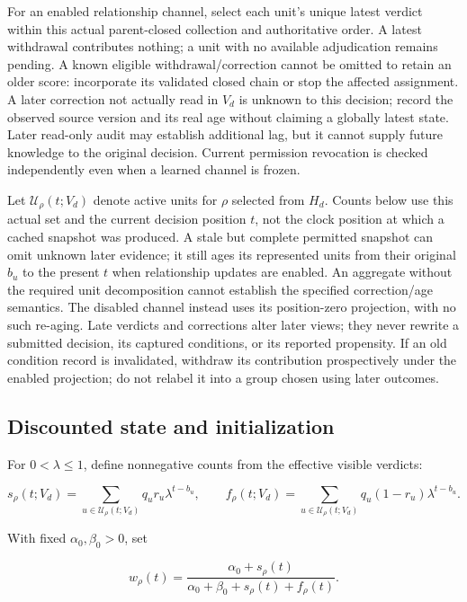 \documentclass[
  english,
  11pt,
]{article}
\begin{document}
For an enabled relationship channel, select each unit's unique latest
verdict within this actual parent-closed collection and authoritative
order. A latest withdrawal contributes nothing; a unit with no available
adjudication remains pending. A known eligible withdrawal/correction
cannot be omitted to retain an older score: incorporate its validated
closed chain or stop the affected assignment. A later correction not
actually read in \(V_d\) is unknown to this decision; record the
observed source version and its real age without claiming a globally
latest state. Later read-only audit may establish additional lag, but it
cannot supply future knowledge to the original decision. Current
permission revocation is checked independently even when a learned
channel is frozen.

Let \(\mathcal U_\rho(t;V_d)\) denote active units for \(\rho\) selected
from \(H_d\). Counts below use this actual set and the current decision
position \(t\), not the clock position at which a cached snapshot was
produced. A stale but complete permitted snapshot can omit unknown later
evidence; it still ages its represented units from their original
\(b_u\) to the present \(t\) when relationship updates are enabled. An
aggregate without the required unit decomposition cannot establish the
specified correction/age semantics. The disabled channel instead uses
its position-zero projection, with no such re-aging. Late verdicts and
corrections alter later views; they never rewrite a submitted decision,
its captured conditions, or its reported propensity. If an old condition
record is invalidated, withdraw its contribution prospectively under the
enabled projection; do not relabel it into a group chosen using later
outcomes.

\subsection{Discounted state and
initialization}\label{discounted-state-and-initialization}

For \(0<\lambda\leq1\), define nonnegative counts from the effective
visible verdicts:

\[
s_\rho(t;V_d)=\sum_{u\in\mathcal U_\rho(t;V_d)}
q_u r_u\lambda^{t-b_u},\qquad
f_\rho(t;V_d)=\sum_{u\in\mathcal U_\rho(t;V_d)}
q_u(1-r_u)\lambda^{t-b_u}.
\]

With fixed \(\alpha_0,\beta_0>0\), set

\[
w_\rho(t)=\frac{\alpha_0+s_\rho(t)}
{\alpha_0+\beta_0+s_\rho(t)+f_\rho(t)}.
\]
\end{document}
